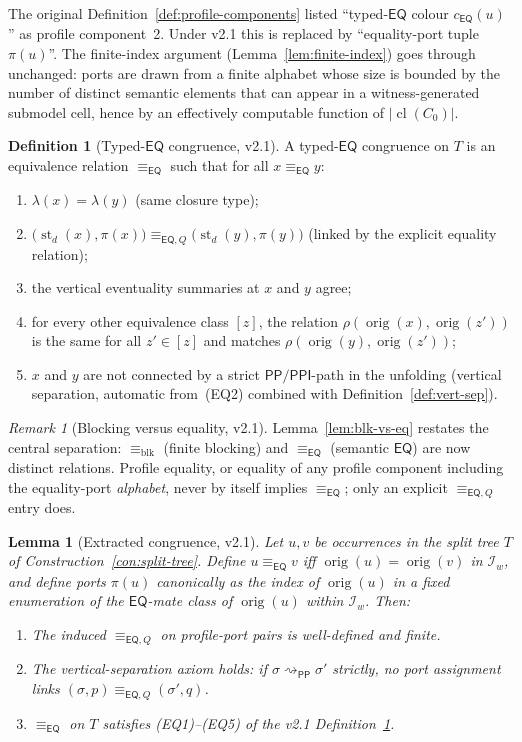\documentclass[11pt]{article}
\newtheorem{lemma}[theorem]{Lemma}
\theoremstyle{definition}
\newtheorem{definition}[theorem]{Definition}
\theoremstyle{remark}
\newtheorem{remark}[theorem]{Remark}
\newcommand{\PP}{\mathsf{PP}}
\newcommand{\PPI}{\mathsf{PPI}}
\newcommand{\EQ}{\mathsf{EQ}}
\newcommand{\cl}{\operatorname{cl}}
\newcommand{\st}{\operatorname{st}}
\newcommand{\orig}{\operatorname{orig}}
\newcommand{\eqcong}{\equiv_{\EQ}}
\newcommand{\eqQ}{\equiv_{\EQ,Q}}
\newcommand{\blk}{\equiv_{\mathrm{blk}}}
\newcommand{\reach}{\rightsquigarrow}
\begin{document}
The original Definition~\ref{def:profile-components} listed
``typed-$\EQ$ colour $c_{\EQ}(u)$'' as profile component~2.  Under
v2.1 this is replaced by ``equality-port tuple $\pi(u)$''.  The
finite-index argument (Lemma~\ref{lem:finite-index}) goes through
unchanged: ports are drawn from a finite alphabet whose size is
bounded by the number of distinct semantic elements that can appear
in a witness-generated submodel cell, hence by an effectively
computable function of $|\cl(C_0)|$.

\begin{definition}[Typed-$\EQ$ congruence, v2.1]\label{def:typed-eq}
A typed-$\EQ$ congruence on $T$ is an equivalence relation
$\eqcong$ such that for all $x\eqcong y$:
\begin{enumerate}[label=(EQ\arabic*),leftmargin=2em]
\item $\lambda(x) = \lambda(y)$ (same closure type);
\item $\bigl(\st_d(x),\pi(x)\bigr) \eqQ \bigl(\st_d(y),\pi(y)\bigr)$
  (linked by the explicit equality relation);
\item the vertical eventuality summaries at $x$ and $y$ agree;
\item for every other equivalence class $[z]$, the relation
  $\rho(\orig(x),\orig(z'))$ is the same for all $z' \in [z]$ and
  matches $\rho(\orig(y),\orig(z'))$;
\item $x$ and $y$ are not connected by a strict $\PP/\PPI$-path
  in the unfolding (vertical separation, automatic from~(EQ2)
  combined with Definition~\ref{def:vert-sep}).
\end{enumerate}
\end{definition}

\begin{remark}[Blocking versus equality, v2.1]
\label{rem:blocking-vs-eq}
Lemma~\ref{lem:blk-vs-eq} restates the central separation: $\blk$
(finite blocking) and $\eqcong$ (semantic $\EQ$) are now distinct
relations.  Profile equality, or equality of any profile component
including the equality-port \emph{alphabet}, never by itself
implies $\eqcong$; only an explicit $\eqQ$ entry does.
\end{remark}

\begin{lemma}[Extracted congruence, v2.1]\label{lem:extracted-eq}
Let $u,v$ be occurrences in the split tree $T$ of
Construction~\ref{con:split-tree}.  Define $u \eqcong v$ iff
$\orig(u) = \orig(v)$ in $\mathcal{I}_w$, and define ports $\pi(u)$
canonically as the index of $\orig(u)$ in a fixed enumeration of
the $\EQ$-mate class of $\orig(u)$ within $\mathcal{I}_w$.  Then:
\begin{enumerate}
\item The induced $\eqQ$ on profile-port pairs is well-defined and
  finite.
\item The vertical-separation axiom holds: if
  $\sigma\reach_{\PP}\sigma'$ strictly, no port assignment links
  $(\sigma,p)\eqQ(\sigma',q)$.
\item $\eqcong$ on $T$ satisfies (EQ1)--(EQ5) of the v2.1
  Definition~\ref{def:typed-eq}.
\end{enumerate}
\end{lemma}
\end{document}
